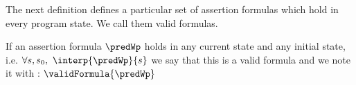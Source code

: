   



%




 

The next definition defines a particular set of assertion formulas which  hold in every program state. We call them  valid formulas. 
\begin{interpretation}\label{assertLang:interpretation:valid}
  If an assertion formula  $ \predWp $ holds in any current state and any initial state, i.e.
$\forall s, s_{0}, \  \interp{\predWp}{s} $ we say that this is a valid formula and we note it with :
  $\validFormula{\predWp} $ 
\end{interpretation}

